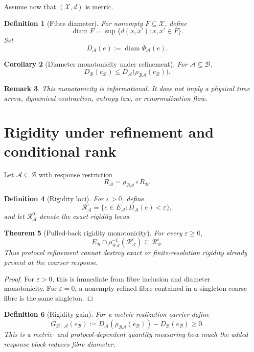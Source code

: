 \documentclass[11pt]{article}
\newtheorem{definition}{Definition}[section]
\newtheorem{theorem}[definition]{Theorem}
\newtheorem{corollary}[definition]{Corollary}
\newtheorem{remark}[definition]{Remark}
\newcommand{\X}{\mathcal X}
\newcommand{\Acal}{\mathcal A}
\newcommand{\Bcal}{\mathcal B}
\begin{document}
Assume now that \((\X,d)\) is metric.

\begin{definition}[Fibre diameter]
For nonempty \(F\subseteq\X\), define
\[
\operatorname{diam}F
=
\sup\{d(x,x'):x,x'\in F\}.
\]
Set
\[
D_{\Acal}(e)
:=
\operatorname{diam}\Phi_{\Acal}(e).
\]
\end{definition}

\begin{corollary}[Diameter monotonicity under refinement]
For \(\Acal\subseteq\Bcal\),
\[
D_{\Bcal}(e_{\Bcal})
\le
D_{\Acal}\bigl(\rho_{\Bcal\Acal}(e_{\Bcal})\bigr).
\]
\end{corollary}

\begin{remark}
This monotonicity is informational. It does not imply a physical time arrow,
dynamical contraction, entropy law, or renormalization flow.
\end{remark}

\section{Rigidity under refinement and conditional rank}

Let \(\Acal\subseteq\Bcal\) with response restriction
\[
R_{\Acal}=\rho_{\Bcal\Acal}\circ R_{\Bcal}.
\]

\begin{definition}[Rigidity loci]
For \(\varepsilon>0\), define
\[
\mathcal R_{\Acal}^{\varepsilon}
=
\{e\in E_{\Acal}:D_{\Acal}(e)<\varepsilon\},
\]
and let \(\mathcal R_{\Acal}^{0}\) denote the exact-rigidity locus.
\end{definition}

\begin{theorem}[Pulled-back rigidity monotonicity]
\label{thm:rigidity-pullback}
For every \(\varepsilon\ge0\),
\[
E_{\Bcal}\cap
\rho_{\Bcal\Acal}^{-1}
(\mathcal R_{\Acal}^{\varepsilon})
\subseteq
\mathcal R_{\Bcal}^{\varepsilon}.
\]
Thus protocol refinement cannot destroy exact or finite-resolution rigidity
already present at the coarser response.
\end{theorem}

\begin{proof}
For \(\varepsilon>0\), this is immediate from fibre inclusion and diameter
monotonicity. For \(\varepsilon=0\), a nonempty refined fibre contained in
a singleton coarse fibre is the same singleton.
\end{proof}

\begin{definition}[Rigidity gain]
For a metric realization carrier define
\[
G_{\Bcal\mid\Acal}(e_{\Bcal})
:=
D_{\Acal}(\rho_{\Bcal\Acal}(e_{\Bcal}))
-D_{\Bcal}(e_{\Bcal})
\ge0.
\]
This is a metric- and protocol-dependent quantity measuring how much the
added response block reduces fibre diameter.
\end{definition}
\end{document}
